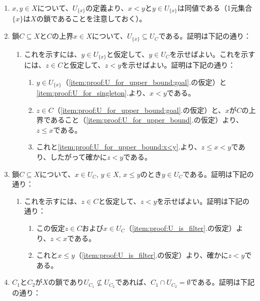 ﻿\documentclass{ltjsarticle}
\theoremstyle{definition}
\begin{document}
\begin{enumerate}
\begin{enumerate}
\begin{enumerate}
        \end{enumerate}
    \end{enumerate}
    \item \label{item:proof:U_for_singleton} $x,y \in X$について、$U_{\{x\}}$の定義より、$x < y$と$y \in U_{\{x\}}$は同値である（1元集合$\{x\}$は$X$の鎖であることを注意しておく）。
    \item \label{item:proof:U_for_upper_bound} 鎖$C \subseteq X$と$C$の上界$x \in X$について、$U_{\{x\}} \subseteq U_C$である。証明は下記の通り：
    \begin{enumerate}
        \item \label{item:proof:U_for_upper_bound:goal} これを示すには、$y \in U_{\{x\}}$と仮定して、$y \in U_C$を示せばよい。これを示すには、$z \in C$と仮定して、$z < y$を示せばよい。証明は下記の通り：
        \begin{enumerate}
            \item \label{item:proof:U_for_upper_bound:x<y} $y \in U_{\{x\}}$（\ref{item:proof:U_for_upper_bound:goal}.の仮定）と\ref{item:proof:U_for_singleton}.より、$x < y$である。
            \item $z \in C$（\ref{item:proof:U_for_upper_bound:goal}.の仮定）と、$x$が$C$の上界であること（\ref{item:proof:U_for_upper_bound}.の仮定）より、$z \leq x$である。
            \item これと\ref{item:proof:U_for_upper_bound:x<y}.より、$z \leq x < y$であり、したがって確かに$z < y$である。
        \end{enumerate}
    \end{enumerate}
    \item \label{item:proof:U_is_filter} 鎖$C \subseteq X$について、$x \in U_C$, $y \in X$, $x \leq y$のとき$y \in U_C$である。証明は下記の通り：
    \begin{enumerate}
        \item これを示すには、$z \in C$と仮定して、$z < y$を示せばよい。証明は下記の通り：
        \begin{enumerate}
            \item この仮定$z \in C$および$x \in U_C$（\ref{item:proof:U_is_filter}.の仮定）より、$z < x$である。
            \item これと$x \leq y$（\ref{item:proof:U_is_filter}.の仮定）より、確かに$z < y$である。
        \end{enumerate}
    \end{enumerate}
    \item \label{item:proof:C_cap_U_C'_is_empty} $C_1$と$C_2$が$X$の鎖であり$U_{C_1} \not\subseteq U_{C_2}$であれば、$C_1 \cap U_{C_2} = \emptyset$である。証明は下記の通り：

\end{enumerate}
\end{document}
